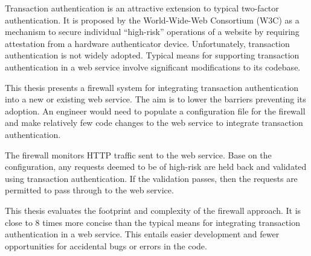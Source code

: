 % 
% 
%
Transaction authentication is an attractive extension to typical two-factor authentication. It is proposed by the World-Wide-Web Consortium (W3C) as a mechanism to secure individual ``high-risk'' operations of a website by requiring attestation from a hardware authenticator device. Unfortunately, transaction authentication is not widely adopted. Typical means for supporting transaction authentication in a web service involve significant modifications to its codebase.

This thesis presents a firewall system for integrating transaction authentication into a new or existing web service. The aim is to lower the barriers preventing its adoption. An engineer would need to populate a configuration file for the firewall and make relatively few code changes to the web service to integrate transaction authentication. 

The firewall monitors HTTP traffic sent to the web service. Base on the configuration, any requests deemed to be of high-risk are held back and validated using transaction authentication. If the validation passes, then the requests are permitted to pass through to the web service.

This thesis evaluates the footprint and complexity of the firewall approach. It is close to 8 times more concise than the typical means for integrating transaction authentication in a web service. This entails easier development and fewer opportunities for accidental bugs or errors in the code.
